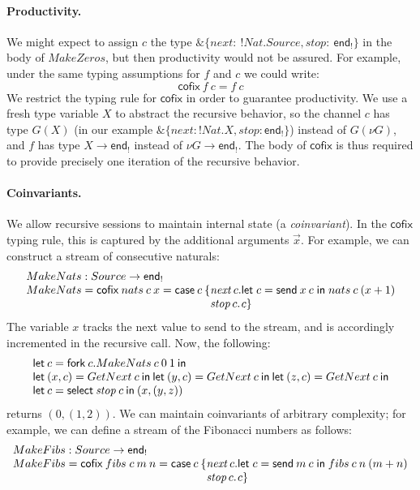 \documentclass[orivec,envcountsame]{llncs}
\makeatletter
\newcommand{\with}{\mathbin\binampersand}
\newcommand{\gvout}[2]{{!#1.#2}}
\newcommand{\uto}{\ensuremath{\rightarrow}}
\newcommand{\outterm}{\mkwd{end}_!}
\newcommand{\mkwd}[1]{\mathsf{#1}}
\newcommand{\clabel}[1]{\mathit{#1}}
\newcommand{\gvsend}[2]{\mkwd{send}\:#1\:#2}
\newcommand{\gvlet}[3]{\mkwd{let}\;#1 = #2\;\mkwd{in}\;#3}
\newcommand{\gvselect}[2]{\mkwd{select}\:#1\:#2}
\newcommand{\gvfork}[2]{\mkwd{fork}\:#1.#2}
\newcommand{\lrkwd}{\mkwd{cofix}}
\newcommand{\key}{\mkwd}
\newcommand{\cofix}{\lrkwd}
\newcommand{\ba}{\begin{array}}
\newcommand{\ea}{\end{array}}
\newcommand{\bl}{\ba[t]{@{}l@{}}}
\newcommand{\el}{\ea}
\makeatother
\begin{document}
\paragraph{Productivity.}
We might expect to assign $c$ the type $\with \{\clabel{next}:\:\gvout{Nat}{Source}, \clabel{stop}:\:\outterm
\}$ in the body of $MakeZeros$, but then productivity would not be assured. For example, under the
same typing assumptions for $f$ and $c$ we could write:
\small\[
\cofix\:f\:c = f\:c
\]\normalsize
%
We restrict the typing rule for $\cofix$ in order to guarantee productivity. We use a fresh type
variable $X$ to abstract the recursive behavior, so the channel $c$ has type $G(X)$ (in our example
$\with \{\clabel{next}: \gvout{Nat}{X}, \clabel{stop}: \outterm \}$) instead of $G(\nu G)$, and $f$ has type
$X \uto \outterm$ instead of $\nu G \uto \outterm$. The body of $\cofix$ is thus required to provide
precisely one iteration of the recursive behavior.

\paragraph{Coinvariants.}

We allow recursive sessions to maintain internal state (a \emph{coinvariant}). In the $\cofix$
typing rule, this is captured by the additional arguments $\vec{x}$. For example, we can construct a
stream of consecutive naturals:
\small\[
\bl
  MakeNats : Source \uto \outterm \\
  MakeNats = \cofix\:nats\:c\:x = \mkwd{case}\:c\:\{
    \ba[t]{@{}l@{}l@{}}
    \clabel{next}\,c.&\gvlet{c}{\gvsend{x}{c}}{nats\:c\:(x+1)} \\
    \clabel{stop}\,c.&c\} \\
    \ea
\el
\]\normalsize
The variable $x$ tracks the next value to send to the stream, and is accordingly incremented in the
recursive call. Now, the following:
\small\[
\bl
\key{let}\:c = \gvfork{c}{MakeNats\:c\:0\:1}\:\key{in} \\
\key{let}\:(x, c) = GetNext\:c\:\key{in}\:
\key{let}\:(y, c) = GetNext\:c\:\key{in}\:
\key{let}\:(z, c) = GetNext\:c\:\key{in} \\
\key{let}\:c = \gvselect{\clabel{stop}}{c}\:\key{in}\:(x,(y,z)) \\
\el
\]\normalsize
returns $(0, (1, 2))$.
%
We can maintain coinvariants of arbitrary complexity; for example, we can define a
stream of the Fibonacci numbers as follows:
\small\[
\bl
  MakeFibs : Source \uto \outterm \\
  MakeFibs = \cofix\:fibs\;c\:m\:n = \mkwd{case}\:c\:\{
    \ba[t]{@{}l@{}l@{}}
    \clabel{next}\,c.& \gvlet{c}{\gvsend{m}{c}}{fibs\:c\:n\:(m+n)} \\
    \clabel{stop}\,c.& c\} \\
    \ea
\el
\]\normalsize
\end{document}
